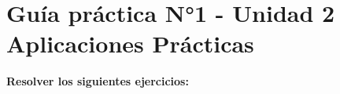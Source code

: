 \documentclass[12pt]{article}
\begin{document}
    
  
    \section*{\centering Guía práctica N°1 - Unidad 2\\Aplicaciones Prácticas}

        \vspace{0.6cm}
        \textbf{Resolver los siguientes ejercicios:}
\end{document}
